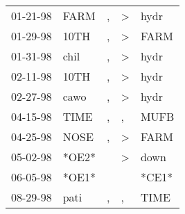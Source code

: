 \begin{supertabular}{lllll}
 01-21-98 &   FARM &  , &  \textgreater &   hydr \\
 01-29-98 &   10TH &  , &  \textgreater &   FARM \\
 01-31-98 &   chil &  , &  \textgreater &   hydr \\
 02-11-98 &   10TH &  , &  \textgreater &   hydr \\
 02-27-98 &   cawo &  , &  \textgreater &   hydr \\
 04-15-98 &   TIME &  , &             , &   MUFB \\
 04-25-98 &   NOSE &  , &  \textgreater &   FARM \\
 05-02-98 &  *OE2* &    &  \textgreater &   down \\
 06-05-98 &  *OE1* &    &               &  *CE1* \\
 08-29-98 &   pati &  , &             , &   TIME \\
\end{supertabular}
